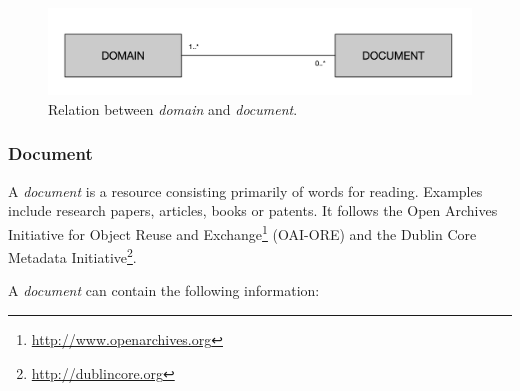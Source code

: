 \begin{figure}
  \center
  \includegraphics[scale=0.45]{model-domain.png}
  \caption{Relation between \textit{domain} and \textit{document}.}
  \label{fig:librairy-model-domain}
\end{figure}

\subsubsection{Document}

A \textit{document} is a resource consisting primarily of words for reading. Examples include research papers, articles, books or patents. It follows the Open Archives Initiative for Object Reuse and Exchange\footnote{\url{http://www.openarchives.org}} (OAI-ORE) and the Dublin Core Metadata Initiative\footnote{\url{http://dublincore.org}}. 

A \textit{document} can contain the following information:                                                              

